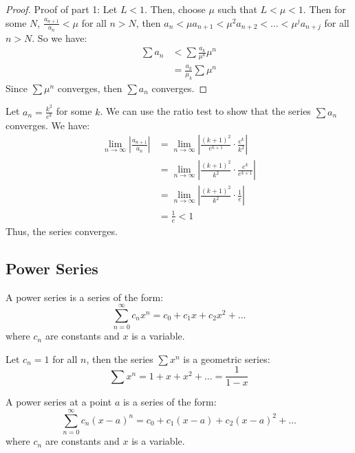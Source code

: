\documentclass[11pt]{article}
\begin{document}
\begin{proof}
    Proof of part 1: Let $L < 1$. Then, choose $\mu$ such that $L < \mu < 1$. Then for some $N$, $ \frac{a_{n+1}}{a_n}  < \mu$ for all $n > N$, then $a_{n} < \mu a_{n+1} < \mu^2 a_{n+2} < \ldots < \mu^j a_{n+j}$ for all $n > N$. So we have:
    \begin{align*}
        \sum a_n &< \sum \frac{a_k}{\mu^k} \mu^n \\
        &= \frac{a_k}{\mu_k} \sum \mu^n
    \end{align*}
    Since $\sum \mu^n$ converges, then $\sum a_n$ converges.
\end{proof}
\begin{example}
    Let $a_n = \frac{k^2}{e^k}$ for some $k$. We can use the ratio test to show that the series $\sum a_n$ converges. We have:
    \begin{align*}
        \lim_{n \to \infty} \left | \frac{a_{n+1}}{a_n} \right | &= \lim_{n \to \infty} \left | \frac{(k+1)^2}{e^{k+1}} \cdot \frac{e^k}{k^2} \right | \\
        &= \lim_{n \to \infty} \left | \frac{(k+1)^2}{k^2} \cdot \frac{e^k}{e^{k+1}} \right | \\
        &= \lim_{n \to \infty} \left | \frac{(k+1)^2}{k^2} \cdot \frac{1}{e} \right | \\
        &= \frac{1}{e} < 1
    \end{align*}
    Thus, the series converges.
\end{example}
\subsection{Power Series}
\begin{definition}
    A power series is a series of the form:
    \begin{equation}
        \sum_{n=0}^{\infty} c_n x^n = c_0 + c_1x + c_2x^2 + \ldots
    \end{equation}
    where $c_n$ are constants and $x$ is a variable. 
\end{definition}
\begin{example}
    Let $c_n = 1$ for all $n$, then the series $\sum x^n$ is a geometric series:
    \begin{equation*}
        \sum x^n = 1 + x + x^2 + \ldots = \frac{1}{1-x}
    \end{equation*}
\end{example}
\begin{definition}
    A power series at a point $a$ is a series of the form:
    \begin{equation}
        \sum_{n=0}^{\infty} c_n (x-a)^n = c_0 + c_1(x-a) + c_2(x-a)^2 + \ldots
    \end{equation}
    where $c_n$ are constants and $x$ is a variable.
\end{definition}
\end{document}
